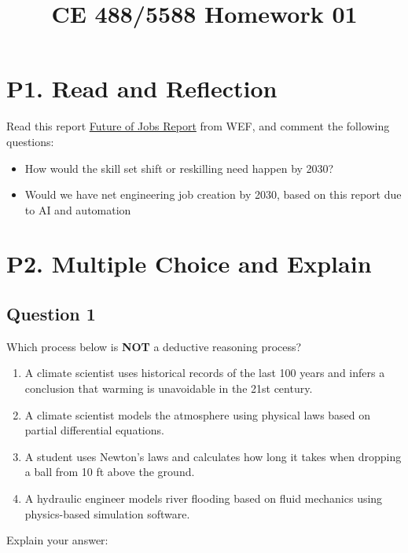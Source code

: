 \documentclass[12pt]{article}
\begin{document}
\title{CE 488/5588 Homework 01\\
\vspace{2in}
\author{}
}
\maketitle

\doublespacing
\newcommand*{\I}{\imath} %

\newpage
\section*{P1. Read and Reflection}
Read this report \href{https://reports.weforum.org/docs/WEF_Future_of_Jobs_Report_2025.pdf}{Future of Jobs Report} from WEF, and comment the following questions:

\begin{itemize}
    \item How would the skill set shift or reskilling need happen by 2030? 
    \item Would we have net engineering job creation by 2030, based on this report due to AI and automation
\end{itemize}

\section*{P2. Multiple Choice and Explain}

\subsection*{Question 1}
Which process below is \textbf{NOT} a deductive reasoning process?

\begin{enumerate}
    \item A climate scientist uses historical records of the last 100 years and infers a conclusion that warming is unavoidable in the 21st century.
    \item A climate scientist models the atmosphere using physical laws based on partial differential equations.
    \item A student uses Newton's laws and calculates how long it takes when dropping a ball from 10 ft above the ground.
    \item A hydraulic engineer models river flooding based on fluid mechanics using physics-based simulation software.
\end{enumerate}
Explain your answer:\\
\fullunderline\\ 
\fullunderline \\ 
\fullunderline \\
\fullunderline
\end{document}
